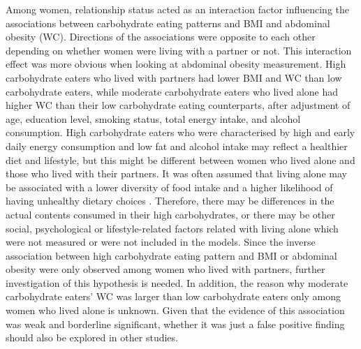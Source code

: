 Among women, relationship status acted as an interaction factor influencing the associations between carbohydrate eating patterns and BMI and abdominal obesity (WC). Directions of the associations were opposite to each other depending on whether women were living with a partner or not. This interaction effect was more obvious when looking at abdominal obesity measurement. High carbohydrate eaters who lived with partners had lower BMI and WC than low carbohydrate eaters, while moderate carbohydrate eaters who lived alone had higher WC than their low carbohydrate eating counterparts, after adjustment of age, education level, smoking status, total energy intake, and alcohol consumption. High carbohydrate eaters who were characterised by high and early daily energy consumption and low fat and alcohol intake may reflect a healthier diet and lifestyle, but this might be different between women who lived alone and those who lived with their partners. It was often assumed that living alone may be associated with a lower diversity of food intake and a higher likelihood of having unhealthy dietary choices \parencite{hanna2015relationship}. Therefore, there may be differences in the actual contents consumed in their high carbohydrates, or there may be other social, psychological or lifestyle-related factors related with living alone which were not measured or were not included in the models. Since the inverse association between high carbohydrate eating pattern and BMI or abdominal obesity were only observed among women who lived with partners, further investigation of this hypothesis is needed. In addition, the reason why moderate carbohydrate eaters' WC was larger than low carbohydrate eaters only among women who lived alone is unknown. Given that the evidence of this association was weak and borderline significant, whether it was just a false positive finding should also be explored in other studies.












